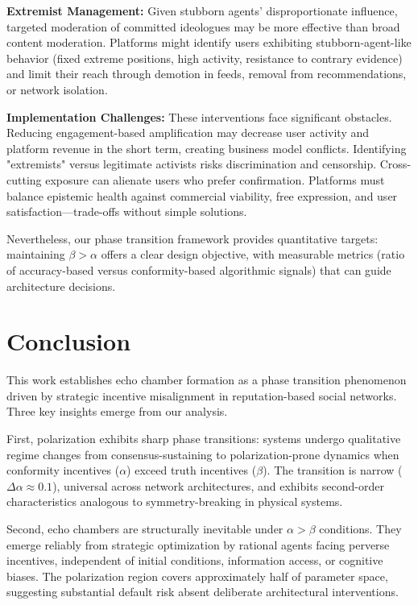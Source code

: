\documentclass[11pt,a4paper]{article}
\begin{document}
\textbf{Extremist Management:} Given stubborn agents' disproportionate influence, targeted moderation of committed ideologues may be more effective than broad content moderation. Platforms might identify users exhibiting stubborn-agent-like behavior (fixed extreme positions, high activity, resistance to contrary evidence) and limit their reach through demotion in feeds, removal from recommendations, or network isolation.

\textbf{Implementation Challenges:} These interventions face significant obstacles. Reducing engagement-based amplification may decrease user activity and platform revenue in the short term, creating business model conflicts. Identifying "extremists" versus legitimate activists risks discrimination and censorship. Cross-cutting exposure can alienate users who prefer confirmation. Platforms must balance epistemic health against commercial viability, free expression, and user satisfaction—trade-offs without simple solutions.

Nevertheless, our phase transition framework provides quantitative targets: maintaining $\beta > \alpha$ offers a clear design objective, with measurable metrics (ratio of accuracy-based versus conformity-based algorithmic signals) that can guide architecture decisions.

\section{Conclusion}

This work establishes echo chamber formation as a phase transition phenomenon driven by strategic incentive misalignment in reputation-based social networks. Three key insights emerge from our analysis.

First, polarization exhibits sharp phase transitions: systems undergo qualitative regime changes from consensus-sustaining to polarization-prone dynamics when conformity incentives ($\alpha$) exceed truth incentives ($\beta$). The transition is narrow ($\Delta\alpha \approx 0.1$), universal across network architectures, and exhibits second-order characteristics analogous to symmetry-breaking in physical systems.

Second, echo chambers are structurally inevitable under $\alpha > \beta$ conditions. They emerge reliably from strategic optimization by rational agents facing perverse incentives, independent of initial conditions, information access, or cognitive biases. The polarization region covers approximately half of parameter space, suggesting substantial default risk absent deliberate architectural interventions.
\end{document}
